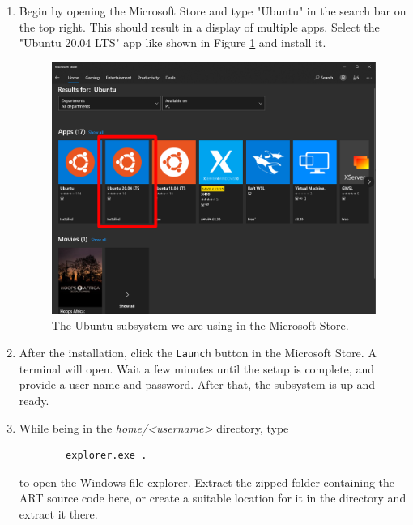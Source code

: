 \begin{enumerate}
	
	\item Begin by opening the Microsoft Store and type "Ubuntu" in the search bar on the top right. This should result in a display of multiple apps. Select the "Ubuntu 20.04 LTS" app like shown in Figure \ref{fig:ubuntu} and install it. 
	\begin{figure}[h]
		\centering
		\includegraphics[width=.8\linewidth]{img/appendix/ubuntu.png}
		\caption{The Ubuntu subsystem we are using in the Microsoft Store.}
		\label{fig:ubuntu}
	\end{figure}
	
	\item After the installation, click the \texttt{Launch} button in the Microsoft Store. A terminal will open. Wait a few minutes until the setup is complete, and provide a user name and password.
	After that, the subsystem is up and ready.
	
	\item While being in the \emph{home/<username>} directory, type
	\begin{Verbatim}
		explorer.exe .
	\end{Verbatim}
	to open the Windows file explorer. Extract the zipped folder containing the ART source code here, or create a suitable location for it in the directory and extract it there.
	

\end{enumerate}
